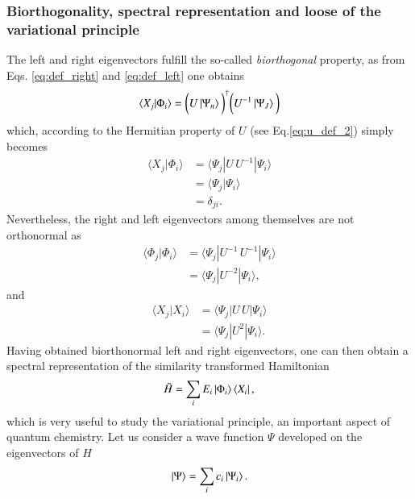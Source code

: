 \documentclass[aip,jcp,reprint,noshowkeys,superscriptaddress]{revtex4-1}
\newcommand{\overlap}[2]{\langle #1 | #2 \rangle}
\newcommand{\matelem}[3]{\langle #1 | #2 | #3 \rangle}
\begin{document}
\subsubsection{Biorthogonality, spectral representation and loose of the variational principle}
The left and right eigenvectors fulfill the so-called \textit{biorthogonal} property, as 
from Eqs. \eqref{eq:def_right} and \eqref{eq:def_left} one obtains 
\begin{equation}
 \overlap{X_j}{\Phi_i} = \bigg(U \ket{\Psi_n} \bigg)^\dagger \bigg(U^{-1}\ket{\Psi_J}\bigg)
\end{equation}
which, according to the Hermitian property of $U$ (see Eq.\eqref{eq:u_def_2}) simply becomes 
\begin{equation}
 \begin{aligned}
 \overlap{X_j}{\Phi_i} &= \matelem{\Psi_j}{U\,U^{-1}}{\Psi_i} \\
                       &= \overlap{\Psi_j}{\Psi_i} \\
                       &= \delta_{ji}.
 \end{aligned}
\end{equation}
Nevertheless, the right and left eigenvectors among themselves are not orthonormal as 
\begin{equation}
 \begin{aligned}
  \overlap{\Phi_j}{\Phi_i} & = \matelem{\Psi_j}{U^{-1}\,U^{-1}}{\Psi_i} \\
                           & = \matelem{\Psi_j}{U^{-2}}{\Psi_i},  
 \end{aligned}
\end{equation}
and 
\begin{equation}
 \begin{aligned}
  \overlap{X_j}{X_i} & = \matelem{\Psi_j}{U\,U}{\Psi_i} \\
                           & = \matelem{\Psi_j}{U^{2}}{\Psi_i}.  
 \end{aligned}
\end{equation}
Having obtained biorthonormal left and right eigenvectors, one can then obtain a spectral representation of the similarity transformed Hamiltonian 
\begin{equation}
 \tilde{H} = \sum_i E_i \ket{\Phi_i} \bra{X_i}, 
\end{equation}
which is very useful to study the variational principle, an important aspect of quantum chemistry. 
Let us consider a wave function $\Psi$ developed on the eigenvectors of $H$
\begin{equation}
 \ket{\Psi} = \sum_i c_i \ket{\Psi_i}.
\end{equation}
\end{document}
